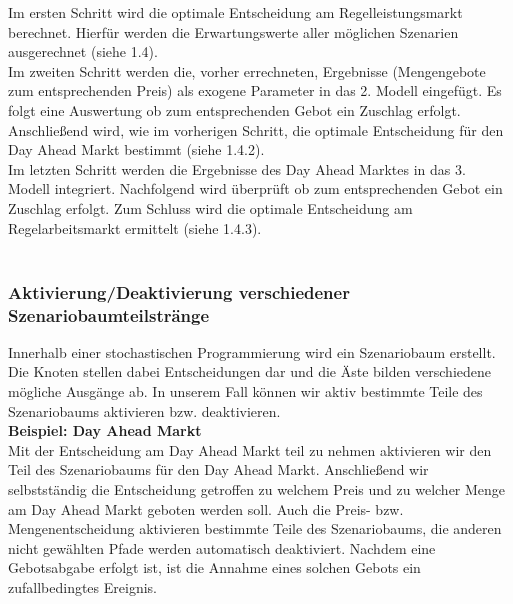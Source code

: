 \documentclass{article}
\begin{document}
Im ersten Schritt wird die optimale Entscheidung am Regelleistungsmarkt berechnet. Hierfür werden die Erwartungswerte aller möglichen Szenarien ausgerechnet (siehe 1.4).\\

Im zweiten Schritt werden die, vorher errechneten, Ergebnisse (Mengengebote zum entsprechenden Preis) als exogene Parameter in das 2. Modell eingefügt. Es folgt eine Auswertung ob zum entsprechenden Gebot ein Zuschlag erfolgt. Anschließend wird, wie im vorherigen Schritt, die optimale Entscheidung für den Day Ahead Markt bestimmt (siehe 1.4.2).\\

Im letzten Schritt werden die Ergebnisse des Day Ahead Marktes in das 3. Modell integriert. Nachfolgend wird überprüft ob zum entsprechenden Gebot ein Zuschlag erfolgt. Zum Schluss wird die optimale Entscheidung am Regelarbeitsmarkt ermittelt (siehe 1.4.3).\\
\\



\subsubsection{Aktivierung/Deaktivierung verschiedener Szenariobaumteilstränge}
 Innerhalb einer stochastischen Programmierung wird ein Szenariobaum erstellt. Die Knoten stellen dabei Entscheidungen dar und die Äste bilden verschiedene mögliche Ausgänge ab. In unserem Fall können wir aktiv bestimmte Teile des Szenariobaums aktivieren bzw. deaktivieren.\\

\textbf{Beispiel: Day Ahead Markt}\\
Mit der Entscheidung am Day Ahead Markt teil zu nehmen aktivieren wir den Teil des Szenariobaums für den Day Ahead Markt. Anschließend wir selbstständig die Entscheidung getroffen zu welchem Preis und zu welcher Menge am Day Ahead Markt geboten werden soll. Auch die Preis- bzw. Mengenentscheidung aktivieren bestimmte Teile des Szenariobaums, die anderen nicht gewählten Pfade werden automatisch deaktiviert. Nachdem eine Gebotsabgabe erfolgt ist, ist die Annahme eines solchen Gebots ein zufallbedingtes Ereignis.
\end{document}
